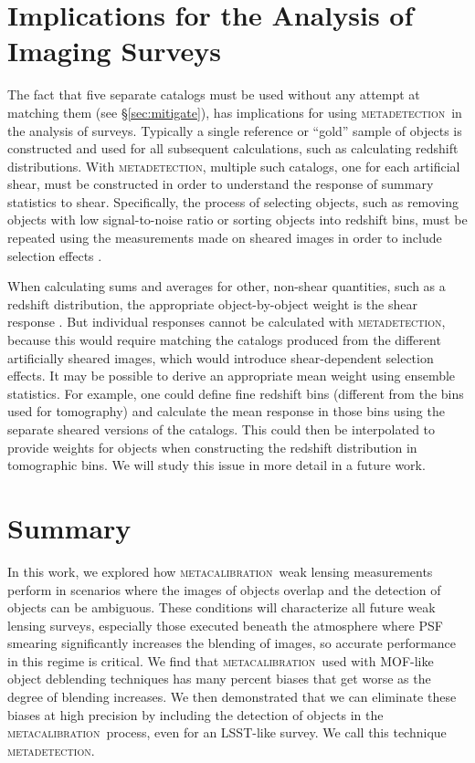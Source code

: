 \documentclass[iop, twocolappendix, appendixfloats, numberedappendix, apj]{hackemulateapj}
\newcommand{\mcal}{\textsc{metacalibration}}
\newcommand{\mdet}{\textsc{metadetection}}
\begin{document}
\section{Implications for the Analysis of Imaging Surveys} \label{sec:wavg}

The fact that five separate catalogs must be used without any attempt at
matching them (see \S \ref{sec:mitigate}), has implications for using \mdet\ in
the analysis of surveys.  Typically a single reference or ``gold'' sample of
objects is constructed and used for all subsequent calculations, such as
calculating redshift distributions.  With \mdet, multiple such catalogs, one
for each artificial shear, must be constructed in order to understand the
response of summary statistics to shear.  Specifically, the process of
selecting objects, such as removing objects with low signal-to-noise ratio or
sorting objects into redshift bins, must be repeated using the measurements made on
sheared images in order to include selection effects \citep{SheldonMcal2017}.

When calculating sums and averages for other, non-shear quantities, such as a
redshift distribution, the appropriate object-by-object weight is the shear
response \citep{SheldonMcal2017}.  But individual responses cannot be
calculated with \mdet, because this would require matching the catalogs
produced from the different artificially sheared images, which would introduce
shear-dependent selection effects.  It may be possible to derive an appropriate
mean weight using ensemble statistics.  For example, one could define fine
redshift bins (different from the bins used for tomography) and calculate the
mean response in those bins using the separate sheared versions of the
catalogs. This could then be interpolated to provide weights for objects when
constructing the redshift distribution in tomographic bins.  We will study this
issue in more detail in a future work.


\section{Summary}\label{sec:conc}

In this work, we explored how \mcal\ weak lensing measurements perform in
scenarios where the images of objects overlap and the detection of objects can
be ambiguous. These conditions will characterize all future weak lensing
surveys, especially those executed beneath the atmosphere where PSF smearing
significantly increases the blending of images, so accurate performance in this
regime is critical. We find that \mcal\ used with MOF-like object deblending
techniques has many percent biases that get worse as the degree of
blending increases. We then demonstrated that we can eliminate these biases at
high precision by including the detection of objects in the \mcal\ process,
even for an LSST-like survey. We call this technique \mdet.
\end{document}
